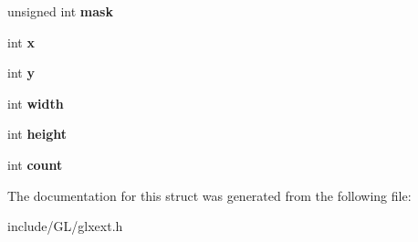 \begin{DoxyCompactItemize}
\item 
\hypertarget{structGLXBufferClobberEventSGIX_a74b4ad1ad3cac011001151411f621da1}{unsigned int {\bfseries mask}}\label{structGLXBufferClobberEventSGIX_a74b4ad1ad3cac011001151411f621da1}

\item 
\hypertarget{structGLXBufferClobberEventSGIX_a5118d48c3c8d5253d39922b5014b52ff}{int {\bfseries x}}\label{structGLXBufferClobberEventSGIX_a5118d48c3c8d5253d39922b5014b52ff}

\item 
\hypertarget{structGLXBufferClobberEventSGIX_aef21efa11558a5b67861f96471c56003}{int {\bfseries y}}\label{structGLXBufferClobberEventSGIX_aef21efa11558a5b67861f96471c56003}

\item 
\hypertarget{structGLXBufferClobberEventSGIX_adad23535733161528427584a42bfc6eb}{int {\bfseries width}}\label{structGLXBufferClobberEventSGIX_adad23535733161528427584a42bfc6eb}

\item 
\hypertarget{structGLXBufferClobberEventSGIX_a7838dbabb76c22aa8241310a3f2363ea}{int {\bfseries height}}\label{structGLXBufferClobberEventSGIX_a7838dbabb76c22aa8241310a3f2363ea}

\item 
\hypertarget{structGLXBufferClobberEventSGIX_ad8f4f0aae058e0a1ff542679823e37a9}{int {\bfseries count}}\label{structGLXBufferClobberEventSGIX_ad8f4f0aae058e0a1ff542679823e37a9}

\end{DoxyCompactItemize}


\-The documentation for this struct was generated from the following file\-:\begin{DoxyCompactItemize}
\item 
include/\-G\-L/glxext.\-h\end{DoxyCompactItemize}
